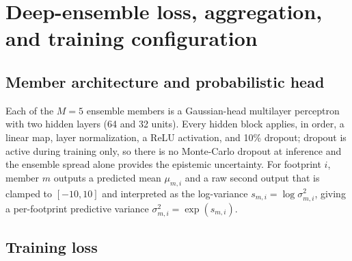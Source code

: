 %
%
%

\section{Deep-ensemble loss, aggregation, and training configuration}
\label{app:model}

\subsection{Member architecture and probabilistic head}

Each of the $M = 5$ ensemble members is a Gaussian-head multilayer perceptron
with two hidden layers (64 and 32 units). Every hidden block applies, in order,
a linear map, layer normalization, a ReLU activation, and 10\% dropout; dropout
is active during training only, so there is no Monte-Carlo dropout at inference
and the ensemble spread alone provides the epistemic uncertainty. For footprint
$i$, member $m$ outputs a predicted mean $\mu_{m,i}$ and a raw second output that
is clamped to $[-10, 10]$ and interpreted as the log-variance
$s_{m,i} = \log\sigma_{m,i}^{2}$, giving a per-footprint predictive variance
$\sigma_{m,i}^{2} = \exp(s_{m,i})$.

\subsection{Training loss}

